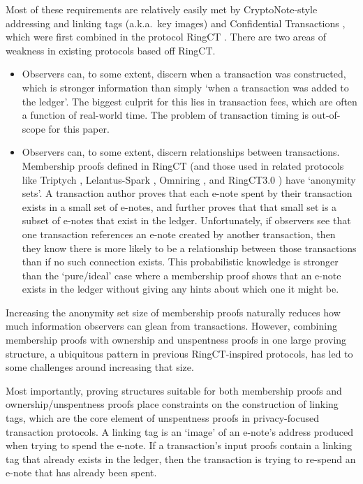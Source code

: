 Most of these requirements are relatively easily met by CryptoNote-style addressing and linking tags (a.k.a.\ key images) \cite{cryptoNoteWhitePaper} and Confidential Transactions \cite{maxwell-ct-2}, which were first combined in the protocol RingCT \cite{MRL-0005-ringct}. There are two areas of weakness in existing protocols based off RingCT.

\begin{itemize}
    \item Observers can, to some extent, discern when a transaction was constructed, which is stronger information than simply `when a transaction was added to the ledger'. The biggest culprit for this lies in transaction fees, which are often a function of real-world time. The problem of transaction timing is out-of-scope for this paper.
    \item Observers can, to some extent, discern relationships between transactions. Membership proofs defined in RingCT (and those used in related protocols like Triptych \cite{triptych-preprint}, Lelantus-Spark \cite{lelantus-spark}, Omniring \cite{omniring-paper}, and RingCT3.0 \cite{ringct3-preprint}) have `anonymity sets'. A transaction author proves that each e-note spent by their transaction exists in a small set of e-notes, and further proves that that small set is a subset of e-notes that exist in the ledger. Unfortunately, if observers see that one transaction references an e-note created by another transaction, then they know there is more likely to be a relationship between those transactions than if no such connection exists. This probabilistic knowledge is stronger than the `pure/ideal' case where a membership proof shows that an e-note exists in the ledger without giving any hints about which one it might be.
\end{itemize}

Increasing the anonymity set size of membership proofs naturally reduces how much information observers can glean from transactions. However, combining membership proofs with ownership and unspentness proofs in one large proving structure, a ubiquitous pattern in previous RingCT-inspired protocols, has led to some challenges around increasing that size.

Most importantly, proving structures suitable for both membership proofs and ownership/unspentness proofs place constraints on the construction of linking tags, which are the core element of unspentness proofs in privacy-focused transaction protocols. A linking tag is an `image' of an e-note's address produced when trying to spend the e-note. If a transaction's input proofs contain a linking tag that already exists in the ledger, then the transaction is trying to re-spend an e-note that has already been spent.

